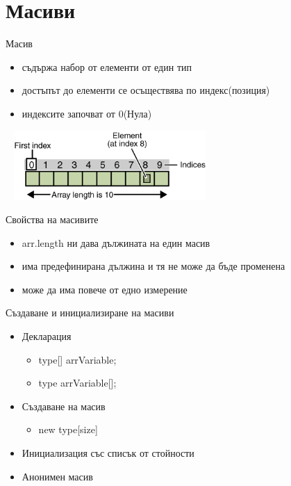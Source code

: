 \documentclass{beamer}
\begin{document}
\section{Масиви}

\begin{frame}{Масив}
  \transdissolve
  \begin{itemize}
    \item съдържа набор от елементи от един тип \pause
    \item достъпът до елементи се осъществява по индекс(позиция) \pause
    \item индексите започват от 0(Нула) \pause
  \end{itemize}
  \includegraphics[width=300px,height=100px]{images/array.png}
\end{frame}

\begin{frame}{Свойства на масивите}
  \transdissolve
  \begin{itemize}
  \item arr.length ни дава дължината на един масив \pause
  \item има предефинирана дължина и тя не може да бъде
    променена \pause
  \item може да има повече от едно измерение
  \end{itemize}
\end{frame}


\begin{frame}{Създаване и инициализиране на масиви}
  \transdissolve
  \begin{itemize}
  \item Декларация
    \begin{itemize}
      \item type[] arrVariable;
      \item type arrVariable[];
    \end{itemize}
  \item Създаване на масив
    \begin{itemize}
      \item new type[size]
    \end{itemize}
  \item Инициализация със списък от стойности
  \item Анонимен масив
  \end{itemize}
\end{frame}
\end{document}
